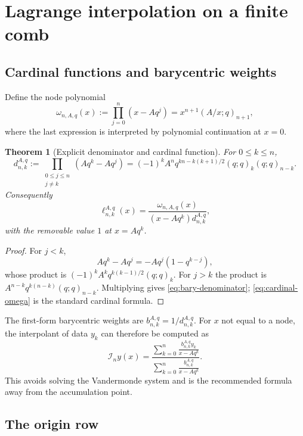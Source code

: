 \documentclass[11pt,oneside]{article}
\numberwithin{equation}{section}
\newtheorem{theorem}{Theorem}[section]
\theoremstyle{definition}
\theoremstyle{remark}
\newcommand{\Ic}{\mathcal I}
\begin{document}
\section{Lagrange interpolation on a finite comb}

\subsection{Cardinal functions and barycentric weights}

Define the node polynomial
\[
 \omega_{n,A,q}(x):=\prod_{j=0}^n(x-Aq^j)
 =x^{n+1}(A/x;q)_{n+1},
\]
where the last expression is interpreted by polynomial continuation at $x=0$.

\begin{theorem}[Explicit denominator and cardinal function]
For $0\le k\le n$,
\begin{equation}
 d_{n,k}^{A,q}:=\prod_{\substack{0\le j\le n\\j\ne k}}
 (Aq^k-Aq^j)
 =(-1)^kA^nq^{kn-k(k+1)/2}(q;q)_k(q;q)_{n-k}.
 \label{eq:bary-denominator}
\end{equation}
Consequently
\begin{equation}
 \ell_{n,k}^{A,q}(x)
 =\frac{\omega_{n,A,q}(x)}{(x-Aq^k)d_{n,k}^{A,q}},
 \label{eq:cardinal-omega}
\end{equation}
with the removable value $1$ at $x=Aq^k$.
\end{theorem}

\begin{proof}
For $j<k$,
\[
 Aq^k-Aq^j=-Aq^j(1-q^{k-j}),
\]
whose product is
$(-1)^kA^kq^{k(k-1)/2}(q;q)_k$.  For $j>k$ the product is
$A^{n-k}q^{k(n-k)}(q;q)_{n-k}$.  Multiplying gives
\eqref{eq:bary-denominator}; \eqref{eq:cardinal-omega} is the standard
cardinal formula.
\end{proof}

The first-form barycentric weights are $b_{n,k}^{A,q}=1/d_{n,k}^{A,q}$.  For
$x$ not equal to a node, the interpolant of data $y_k$ can therefore be
computed as
\begin{equation}
 \Ic_n y(x)=
 \frac{\displaystyle\sum_{k=0}^n\frac{b_{n,k}^{A,q}y_k}{x-Aq^k}}
      {\displaystyle\sum_{k=0}^n\frac{b_{n,k}^{A,q}}{x-Aq^k}}.
 \label{eq:barycentric-second}
\end{equation}
This avoids solving the Vandermonde system and is the recommended formula away
from the accumulation point.

\subsection{The origin row}
\end{document}
